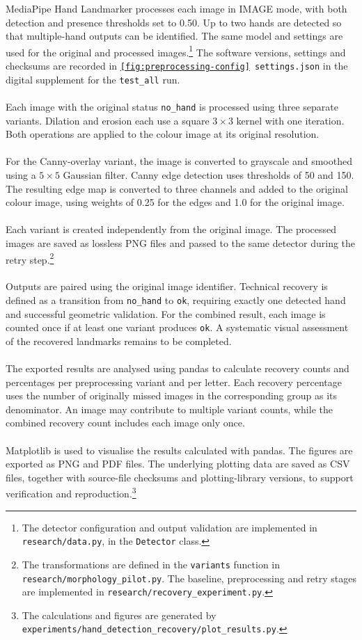        MediaPipe Hand Landmarker processes each image in IMAGE mode, with both detection and presence thresholds set to 0.50. Up to two hands are detected so that multiple-hand outputs can be identified. The same model and settings are used for the original and processed images.\footnote{The detector configuration and output validation are implemented in \texttt{research/data.py}, in the \texttt{Detector} class.} The software versions, settings and checksums are recorded in \texttt{\ref{fig:preprocessing-config} settings.json} in the digital supplement for the \texttt{test\_all} run.
        \\\\
        Each image with the original status \texttt{no\_hand} is processed using three separate variants. Dilation and erosion each use a square $3 \times 3$ kernel with one iteration. Both operations are applied to the colour image at its original resolution.
        \\\\
        For the Canny-overlay variant, the image is converted to grayscale and smoothed using a $5 \times 5$ Gaussian filter. Canny edge detection uses thresholds of 50 and 150. The resulting edge map is converted to three channels and added to the original colour image, using weights of 0.25 for the edges and 1.0 for the original image.
        \\\\
        Each variant is created independently from the original image. The processed images are saved as lossless PNG files and passed to the same detector during the retry step.\footnote{The transformations are defined in the \texttt{variants} function in \texttt{research/morphology\_pilot.py}. The baseline, preprocessing and retry stages are implemented in \texttt{research/recovery\_experiment.py}.}
        \\\\
        Outputs are paired using the original image identifier. Technical recovery is defined as a transition from \texttt{no\_hand} to \texttt{ok}, requiring exactly one detected hand and successful geometric validation. For the combined result, each image is counted once if at least one variant produces \texttt{ok}. A systematic visual assessment of the recovered landmarks remains to be completed.
        \\\\
        The exported results are analysed using pandas to calculate recovery counts and percentages per preprocessing variant and per letter. Each recovery percentage uses the number of originally missed images in the corresponding group as its denominator. An image may contribute to multiple variant counts, while the combined recovery count includes each image only once.
        \\\\
        Matplotlib is used to visualise the results calculated with pandas. The figures are exported as PNG and PDF files. The underlying plotting data are saved as CSV files, together with source-file checksums and plotting-library versions, to support verification and reproduction.\footnote{The calculations and figures are generated by \texttt{experiments/hand\_detection\_recovery/plot\_results.py}.}
        
